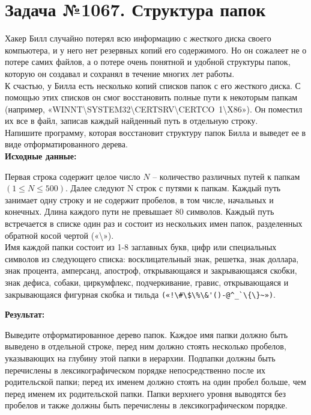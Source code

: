 \documentclass[a4paper,12pt]{article}
\begin{document}
\section*{Задача №1067. Структура папок}
Хакер Билл случайно потерял всю информацию с жесткого диска своего компьютера, и у него нет резервных копий его содержимого. Но он сожалеет не о потере самих файлов, а о потере очень понятной и удобной структуры папок, которую он создавал и сохранял в течение многих лет работы.\\[0.5em]
К счастью, у Билла есть несколько копий списков папок с его жесткого диска. С помощью этих списков он смог восстановить полные пути к некоторым папкам (например, «WINNT\textbackslash SYSTEM32\textbackslash CERTSRV\textbackslash CERTCO~1\textbackslash X86»). Он поместил их все в файл, записав каждый найденный путь в отдельную строку.\\[0.5em]
Напишите программу, которая восстановит структуру папок Билла и выведет ее в виде отформатированного дерева.\\[1em]
\textbf{Исходные данные:}
\begin{quotebox}
    Первая строка содержит целое число $N$ – количество различных путей к папкам $(1 \leq N \leq 500)$. Далее следуют N строк с путями к папкам. Каждый путь занимает одну строку и не содержит пробелов, в том числе, начальных и конечных. Длина каждого пути не превышает 80 символов. Каждый путь встречается в списке один раз и состоит из нескольких имен папок, разделенных обратной косой чертой («\textbackslash»).\\[0.5em]
    Имя каждой папки состоит из 1-8 заглавных букв, цифр или специальных символов из следующего списка: восклицательный знак, решетка, знак доллара, знак процента, амперсанд, апостроф, открывающаяся и закрывающаяся скобки, знак дефиса, собаки, циркумфлекс, подчеркивание, гравис, открывающаяся и закрывающаяся фигурная скобка и тильда \verb|(«!\#\$\%\&'()-@^_`\{\}~»)|.
\end{quotebox}
\textbf{Результат:}
\begin{quotebox}
    Выведите отформатированное дерево папок. Каждое имя папки должно быть выведено в отдельной строке, перед ним должно стоять несколько пробелов, указывающих на глубину этой папки в иерархии. Подпапки должны быть перечислены в лексикографическом порядке непосредственно после их родительской папки; перед их именем должно стоять на один пробел больше, чем перед именем их родительской папки. Папки верхнего уровня выводятся без пробелов и также должны быть перечислены в лексикографическом порядке.
\end{quotebox}
\end{document}
